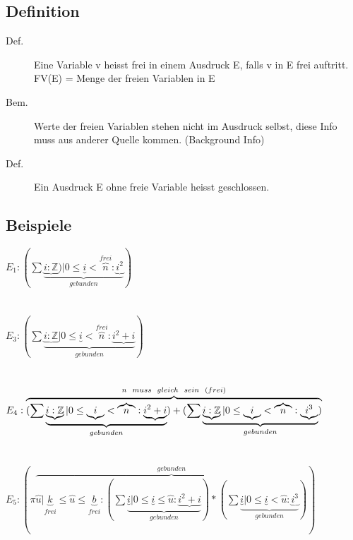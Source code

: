 \documentclass[a4paper,10pt]{article}
\newcommand{\ZN}{\mathbb{Z}} %
\begin{document}
\subsection{Definition}

\begin{description}
	\item[Def.] Eine Variable v heisst frei in einem Ausdruck E, falls v in E frei auftritt. \\
		FV(E) = Menge der freien Variablen in E
	\item[Bem.] Werte der freien Variablen stehen nicht im Ausdruck selbst, diese Info muss aus anderer Quelle kommen. (Background Info)
	\item[Def.] Ein Ausdruck E ohne freie Variable heisst geschlossen.
\end{description}

\subsection{Beispiele}
$E_1 : (\sum \underbrace{\underbrace{i:\ZN}) | 0 \leq \underbrace{i} < \overbrace{n}^{frei} : \underbrace{i^2}}_{gebunden})$ \\ \\ \\
$E_3:(\sum \underbrace{\underbrace{i:\ZN} | 0 \leq  \underbrace{i} < \overbrace{n}^{frei} : \underbrace{i^2+i}}_{gebunden})$ \\ \\ \\
$E_4 : \overbrace{(\sum \underbrace{\underbrace{i:\ZN} | 0 \leq \underbrace{i} < \overbrace{n} : \underbrace{i^2+i}}_{gebunden}) +(\sum \underbrace{\underbrace{i:\ZN} | 0 \leq \underbrace{i} < \overbrace{n} : \underbrace{i^3}}_{gebunden})}^{n \hspace{2mm}  muss \hspace{2mm} gleich \hspace{2mm} sein \hspace{2mm} (frei)}$ \\ \\ \\
$E_5 :(\pi \overbrace{\overbrace{u} | \underbrace{k}_{frei} \leq \overbrace{u} \leq \underbrace{b}_{frei} : (\sum \underbrace{\underbrace{i} | 0 \leq \underbrace{i} \leq \overbrace{u} : \underbrace{i^2+i}}_{gebunden} )*(\sum \underbrace{\underbrace{i} | 0 \leq \underbrace{i} < \overbrace{u} : \underbrace{i^3}}_{gebunden})}^{gebunden})$
\end{document}
